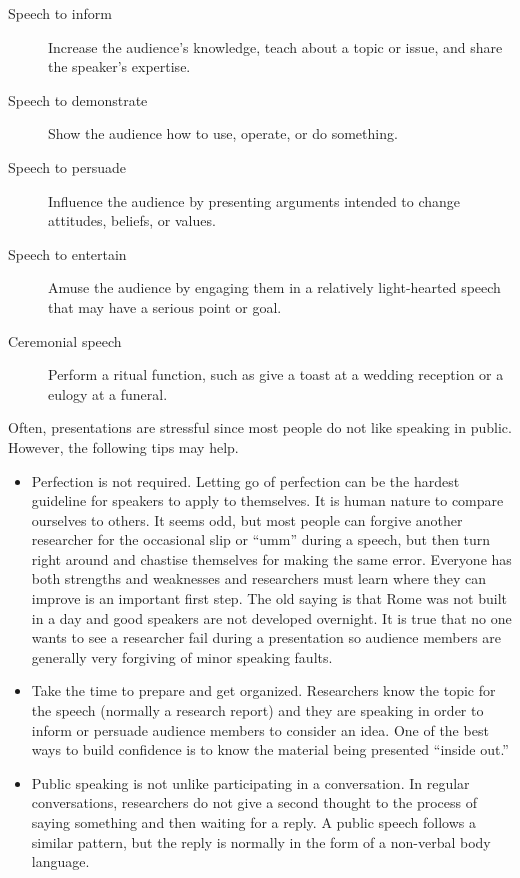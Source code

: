 \begin{description}
	\item[Speech to inform] Increase the audience's knowledge, teach about a topic
	or issue, and share the speaker's expertise.
	\item[Speech to demonstrate] Show the audience how to use, operate, or do
	something.
	\item[Speech to persuade] Influence the audience by presenting arguments
	intended to change attitudes, beliefs, or values.
	\item[Speech to entertain] Amuse the audience by engaging them in a
	relatively light-hearted speech that may have a serious point or goal.
	\item[Ceremonial speech] Perform a ritual function, such as give a toast at a
	wedding reception or a eulogy at a funeral.
\end{description}

Often, presentations are stressful since most people do not like speaking in public. However, the following tips may help.

\begin{itemize}
	\item Perfection is not required. Letting go of perfection can be the hardest guideline for speakers to apply to themselves. It is human nature to compare ourselves to others. It seems odd, but most people can forgive another researcher for the occasional slip or ``umm'' during a speech, but then turn right around and chastise themselves for making the same error. Everyone has both strengths and weaknesses and researchers must learn where they can improve is an important first step. The old saying is that Rome was not built in a day and good speakers are not developed overnight. It is true that no one wants to see a researcher fail during a presentation so audience members are generally very forgiving of minor speaking faults.
	\item Take the time to prepare and get organized. Researchers know the topic for the speech (normally a research report) and they are speaking in order to inform or persuade audience members to consider an idea. One of the best ways to build confidence is to know the material being presented ``inside out.''
	\item Public speaking is not unlike participating in a conversation. In regular conversations, researchers do not give a second thought to the process of saying something and then waiting for a reply. A public speech follows a similar pattern, but the reply is normally in the form of a non-verbal body language.
\end{itemize}


